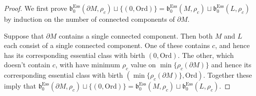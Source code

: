 \documentclass[a4paper,11pt]{article}
\theoremstyle{definition}
\newcommand{\Ord}{\textrm{Ord}}
\newcommand{\Ess}{\textrm{Ess}}
\begin{document}
\begin{proof}
We first prove $\mathfrak{b}_0^{\Ess}(\partial M,\rho_c) \sqcup \{(0, \Ord)\}=\mathfrak{b}_0^{\Ess}(M,\rho_c)\sqcup \mathfrak{b}_0^{\Ess}(L,\rho_c)$ by induction on the number of connected components of $\partial M$.

Suppose that $\partial M$ contains a single connected component. Then both $M$ and $L$ each consist of a single connected component. One of these contains $c$, and hence has its corresponding essential class with birth $(0, \Ord)$. The other, which doesn't contain $c$, with have minimum $\rho_c$ value on $\min\{\rho_c(\partial M)\}$ and hence its corresponding essential class with birth $(\min\{\rho_c(\partial M)\}, \Ord)$. Together these imply that $\mathfrak{b}_0^{\Ess}(\partial M,\rho_c) \sqcup \{(0, \Ord)\}=\mathfrak{b}_0^{\Ess}(M,\rho_c)\sqcup \mathfrak{b}_0^{\Ess}(L,\rho_c)$. 


\end{proof}
\end{document}
